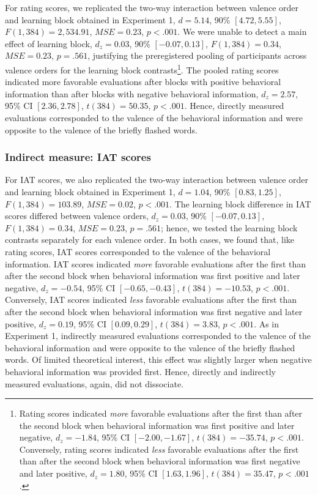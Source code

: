\documentclass[
  man,floatsintext]{apa6}
\begin{document}
For rating scores, we replicated the two-way interaction between valence order and learning block obtained in Experiment 1, \(d = 5.14\), 90\% \([4.72, 5.55]\), \(F(1, 384) = 2,534.91\), \(\mathit{MSE} = 0.23\), \(p < .001\).
We were unable to detect a main effect of learning block, \(d_z = 0.03\), 90\% \([-0.07, 0.13]\), \(F(1, 384) = 0.34\), \(\mathit{MSE} = 0.23\), \(p = .561\), justifying the preregistered pooling of participants across valence orders for the learning block contrasts\footnote{Rating scores indicated \emph{more} favorable evaluations after the first than after the second block when behavioral information was first positive and later negative, \(d_z = -1.84\), 95\% CI \([-2.00, -1.67]\), \(t(384) = -35.74\), \(p < .001\).
  Conversely, rating scores indicated \emph{less} favorable evaluations after the first than after the second block when behavioral information was first negative and later positive, \(d_z = 1.80\), 95\% CI \([1.63, 1.96]\), \(t(384) = 35.47\), \(p < .001\).}.
The pooled rating scores indicated more favorable evaluations after blocks with positive behavioral information than after blocks with negative behavioral information, \(d_z = 2.57\), 95\% CI \([2.36, 2.78]\), \(t(384) = 50.35\), \(p < .001\).
Hence, directly measured evaluations corresponded to the valence of the behavioral information and were opposite to the valence of the briefly flashed words.

\hypertarget{indirect-measure-iat-scores-1}{%
\subsubsection{Indirect measure: IAT scores}\label{indirect-measure-iat-scores-1}}

For IAT scores, we also replicated the two-way interaction between valence order and learning block obtained in Experiment 1, \(d = 1.04\), 90\% \([0.83, 1.25]\), \(F(1, 384) = 103.89\), \(\mathit{MSE} = 0.02\), \(p < .001\).
The learning block difference in IAT scores differed between valence orders, \(d_z = 0.03\), 90\% \([-0.07, 0.13]\), \(F(1, 384) = 0.34\), \(\mathit{MSE} = 0.23\), \(p = .561\); hence, we tested the learning block contrasts separately for each valence order.
In both cases, we found that, like rating scores, IAT scores corresponded to the valence of the behavioral information.
IAT scores indicated \emph{more} favorable evaluations after the first than after the second block when behavioral information was first positive and later negative, \(d_z = -0.54\), 95\% CI \([-0.65, -0.43]\), \(t(384) = -10.53\), \(p < .001\).
Conversely, IAT scores indicated \emph{less} favorable evaluations after the first than after the second block when behavioral information was first negative and later positive, \(d_z = 0.19\), 95\% CI \([0.09, 0.29]\), \(t(384) = 3.83\), \(p < .001\).
As in Experiment 1, indirectly measured evaluations corresponded to the valence of the behavioral information and were opposite to the valence of the briefly flashed words.
Of limited theoretical interest, this effect was slightly larger when negative behavioral information was provided first.
Hence, directly and indirectly measured evaluations, again, did not dissociate.
\end{document}
